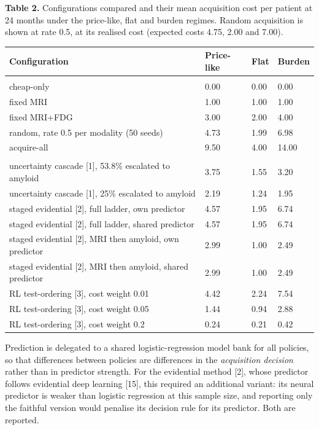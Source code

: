 \documentclass[12pt,twoside]{article}
\begin{document}
\begin{spacing}{1.0}
\begin{table}[!htbp]
\centering
\textbf{Table 2.} Configurations compared and their mean acquisition cost per
patient at 24 months under the price-like, flat and burden regimes. Random
acquisition is shown at rate 0.5, at its realised cost (expected costs 4.75,
2.00 and 7.00).\\\vspace{5pt}
\small
\begin{tabular}{|>{\raggedright\arraybackslash}p{8.6cm}|M{1.7cm}|M{1.5cm}|M{1.6cm}|}
\hline
\textbf{Configuration} & \textbf{Price-like} & \textbf{Flat} & \textbf{Burden} \\
\hline
{} \\\hline
cheap-only & 0.00 & 0.00 & 0.00 \\\hline
fixed MRI & 1.00 & 1.00 & 1.00 \\\hline
fixed MRI+FDG & 3.00 & 2.00 & 4.00 \\\hline
random, rate 0.5 per modality (50 seeds) & 4.73 & 1.99 & 6.98 \\\hline
acquire-all & 9.50 & 4.00 & 14.00 \\\hline
{} \\\hline
uncertainty cascade [1], 53.8\% escalated to amyloid & 3.75 & 1.55 & 3.20 \\\hline
uncertainty cascade [1], 25\% escalated to amyloid & 2.19 & 1.24 & 1.95 \\\hline
staged evidential [2], full ladder, own predictor & 4.57 & 1.95 & 6.74 \\\hline
staged evidential [2], full ladder, shared predictor & 4.57 & 1.95 & 6.74 \\\hline
staged evidential [2], MRI then amyloid, own predictor & 2.99 & 1.00 & 2.49 \\\hline
staged evidential [2], MRI then amyloid, shared predictor & 2.99 & 1.00 & 2.49 \\\hline
RL test-ordering [3], cost weight 0.01 & 4.42 & 2.24 & 7.54 \\\hline
RL test-ordering [3], cost weight 0.05 & 1.44 & 0.94 & 2.88 \\\hline
RL test-ordering [3], cost weight 0.2 & 0.24 & 0.21 & 0.42 \\\hline
\end{tabular}
\end{table}

Prediction is delegated to a shared logistic-regression model bank for all
policies, so that differences between policies are differences in the
\emph{acquisition decision} rather than in predictor strength. For the
evidential method [2], whose predictor follows evidential deep learning
[15], this required an additional variant: its neural predictor is weaker
than logistic regression at this sample size, and reporting only the
faithful version would penalise its decision rule for its predictor. Both
are reported.


\end{spacing}
\end{document}

